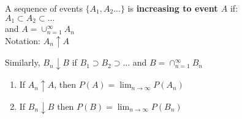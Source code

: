 \documentclass[14pt, oneside, letterpaper]{notes}
\begin{document}
\begin{mydef}
	A sequence of events $\{A_1, A_2 ...\}$ is \textbf{increasing to event $A$} if: \\
	\indent $A_1 \subset A_2 \subset ...$  \\
	\indent and $A = \cup_{n=1}^{\infty} A_n$ \\
	\indent Notation: $A_n \uparrow A$
\end{mydef}

\begin{mydef}
	Similarly, $B_n \downarrow B$ if $B_1 \supset B_2 \supset ... $ and
	$B = \cap_{n=1}^{\infty} B_n$ 
\end{mydef}

\begin{enumerate}[resume]	
	\item If $A_n \uparrow A$, then $P(A) = \lim_{n \to \infty} P(A_n)$ 

	\item If $B_n \downarrow B$ then $P(B) = \lim_{n \to \infty} P(B_n)$ 
\end{enumerate}
\end{document}
